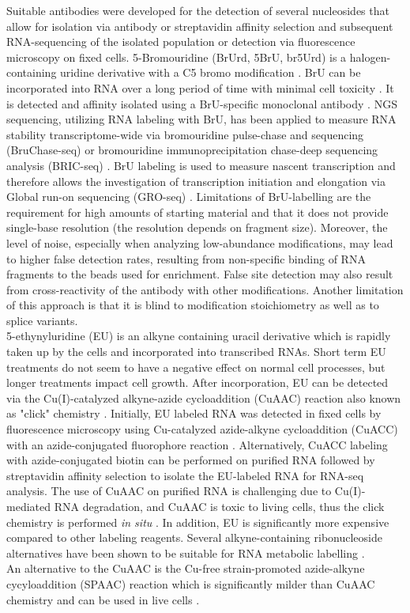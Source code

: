 Suitable antibodies were developed for the detection of several nucleosides that allow for isolation via antibody or streptavidin affinity selection and subsequent RNA-sequencing of the isolated population or detection via fluorescence microscopy on fixed cells.
 5-Bromouridine (BrUrd, 5BrU, br5Urd) is a halogen-containing uridine derivative with a C5 bromo modification \citep{Haider1997}. BrU can be incorporated into RNA over a long period of time  with minimal cell toxicity \citep{Tani2012}. It is detected and affinity isolated using a BrU-specific monoclonal antibody \citep{Halicka2000}. NGS sequencing, utilizing RNA labeling with BrU, has been applied to measure RNA stability transcriptome-wide via bromouridine pulse-chase and sequencing (BruChase-seq) \citep{Paulsen2013} or bromouridine immunoprecipitation chase-deep sequencing analysis (BRIC-seq) \citep{Tani2012}. BrU labeling is  used  to measure nascent transcription and therefore allows the investigation of transcription initiation and elongation via Global run-on sequencing (GRO-seq) \citep{Core2008}. Limitations of BrU-labelling are the requirement for high amounts of starting material and that it does not provide single-base resolution (the resolution depends on fragment size). Moreover, the level of noise, especially when analyzing low-abundance modifications, may lead to higher false detection rates, resulting from non-specific binding of RNA fragments to the beads used for enrichment. False site detection may also result from cross-reactivity of the antibody with other modifications. Another limitation of this approach is that it is blind to modification stoichiometry as well as to splice variants.\\
5-ethynyluridine (EU) is an alkyne containing uracil derivative which is rapidly taken up by the cells  and incorporated into transcribed RNAs. Short term EU treatments do not seem to have a negative effect on normal cell processes, but longer treatments impact cell growth. After incorporation, EU can be detected via the Cu(I)-catalyzed alkyne-azide cycloaddition (CuAAC) reaction also known as "click" chemistry \citep{Jao2008,Paredes2011}. Initially, EU labeled RNA was detected in fixed cells by fluorescence microscopy using Cu-catalyzed azide-alkyne cycloaddition (CuACC) with an azide-conjugated fluorophore reaction \citep{Jao2008}. Alternatively, CuACC labeling with azide-conjugated biotin can be performed on purified RNA followed by streptavidin affinity selection to isolate the EU-labeled RNA for RNA-seq analysis. The use of CuAAC on purified RNA is challenging due to Cu(I)-mediated RNA degradation, and CuAAC is toxic to living cells, thus the click chemistry is performed \textit{in situ} \citep{Paredes2011}. In addition, EU is significantly more expensive compared to other labeling reagents.  Several alkyne-containing ribonucleoside alternatives have been shown to be suitable for RNA metabolic labelling \citep{Curanovic2013,Grammel2012,Qu2013}. \\
An alternative to the CuAAC is the Cu-free strain-promoted azide-alkyne cycyloaddition (SPAAC) reaction which is significantly milder than CuAAC chemistry and can be used in live cells \citep{Baskin2007,Nainar2016}. 

